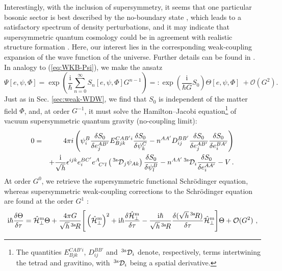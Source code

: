 \documentclass[12pt]{iopart}
\def\eref#1{(\ref{eq:#1})}
\def\I{\mathrm{i}}
\def\Ob{\mathcal{O}}
\newcommand{\fal}[2]{\frac{\delta{#1}}{\delta{#2}}} %
\newcommand{\threesD}{{\,}^{\rm{3s}}\hspace{-0.0mm}\mathcal{D}} %
\newcommand{\threesR}{{\,}^{\rm{3s}}\hspace{-0.5mm}R} %
\newcommand{\Hmbot}{{\hat{\mathcal{H}}^{\rm{m}}_\bot}}
\newcommand{\eps}{\epsilon}
\begin{document}
Interestingly, with the inclusion of supersymmetry, it seems that one particular bosonic sector 
is best described by the 
no-boundary 
state \citep{HalliwellHawking}, which leads to a satisfactory 
spectrum of density perturbations, and it may indicate that supersymmetric quantum cosmology could be in agreement with realistic structure formation \citep{Moniz:1998zz}. Here, our interest lies in the corresponding weak-coupling expansion of the wave function of the universe. Further details can be found in  \citet{kiefer2005semiclassical}. In analogy to \eref{WKB-Psi}, we make the ansatz
\begin{equation}
\Psi[e,\psi,\Phi]=\exp\left(\frac{\I}{\hbar}\sum_{n=0}^{\infty}S_n[e,\psi,\Phi] G^{n-1}\right) =: \exp\left(\frac{\I}{\hbar G}S_0\right)\Theta[e,\psi,\Phi]\ + \Ob(G^2).
  \label{NEW20}
\end{equation}
Just as in Sec. \ref{sec:weak-WDW}, we find that $S_0$ is independent of the matter field $\Phi$, and, at order $G^{-1}$, it must solve the Hamilton--Jacobi equation\footnote{The quantities ${E^{CAB'i}_{Bjk}}$, ${D^{{BB'}}_{ij}}$ and $\threesD_i$ denote, respectively, terms intertwining the tetrad and gravitino, with $\threesD_i$ being a spatial derivative.} of vacuum supersymmetric quantum gravity (no-coupling limit):
\begin{eqnarray}
  \label{susy HJ eq.}
  0 &=&  4\pi i\left(\psi^B_i\fal{S_0}{e^{AB'}_j}{E^{CAB'i}_{Bjk}}\fal{S_0}{\psi^C_k}
  -n^{AA'}{D^{{BB'}}_{ij}}\fal{S_0}{e^{AB'}_j}\fal{S_0}{e^{BA'}_i}\right)
  \nonumber\\
  &&+\frac{\I}{\sqrt{h}}\eps^{ijk}e^{BC'}_ie^{A}_{\hspace{1.6mm} C'l} \left({\threesD}_j\psi_{Ak}\right)\fal{S_0}{\psi^B_l}
    -n^{AA'}\threesD_i\fal{S_0}{e^{AA'}_i}-V\,.
\end{eqnarray} 
At order $G^{0}$, we retrieve 
the supersymmetric functional Schr\"odinger equation, whereas supersymmetric weak-coupling corrections to the Schr\"odinger equation are found at the order $G^1$ \citep{kiefer2005semiclassical}: 
\begin{equation}
\label{eq:SUSY-schro}
  \I\hbar\fal{\Theta}{\tau}=\Hmbot\Theta
  +\frac{4\pi
  G}{\sqrt{h}\threesR}\Bigg[\left({\Hmbot}\right)^2+\I\hbar\fal{\Hmbot}{\tau}
  -\frac{\I\hbar}{\sqrt{h}\threesR}\fal{(\sqrt{h}\threesR)}{\tau}\Hmbot\Bigg]\Theta+\Ob(G^2) \ ,
\end{equation}
\end{document}
